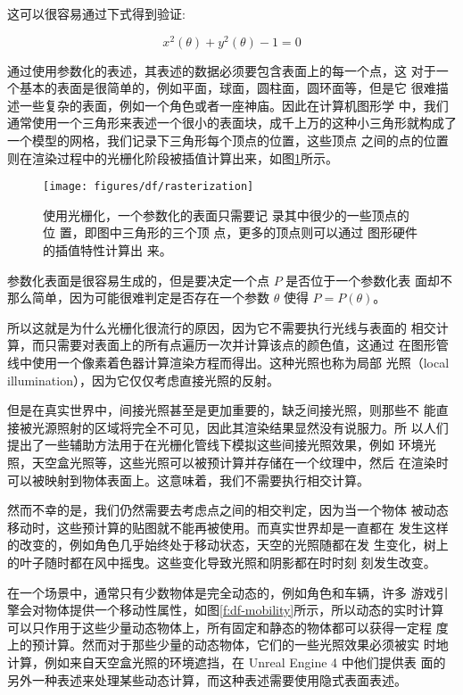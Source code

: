 \noindent 这可以很容易通过下式得到验证:

\begin{equation}
	x^{2}(\theta)+y^{2}(\theta)-1=0
\end{equation}

通过使用参数化的表述，其表述的数据必须要包含表面上的每一个点，这 对于一个基本的表面是很简单的，例如平面，球面，圆柱面，圆环面等，但是它 很难描述一些复杂的表面，例如一个角色或者一座神庙。因此在计算机图形学 中，我们通常使用一个三角形来表述一个很小的表面块，成千上万的这种小三角形就构成了一个模型的网格，我们记录下三角形每个顶点的位置，这些顶点 之间的点的位置则在渲染过程中的光栅化阶段被插值计算出来，如图\ref{f:df-rasterization}所示。

\begin{figure}
	\sidecaption
	\texttt{[image: figures/df/rasterization]}
	\caption{使用光栅化，一个参数化的表面只需要记 录其中很少的一些顶点的位 置，即图中三角形的三个顶 点，更多的顶点则可以通过 图形硬件的插值特性计算出 来。}
	\label{f:df-rasterization}
\end{figure}

参数化表面是很容易生成的，但是要决定一个点 $P$ 是否位于一个参数化表 面却不那么简单，因为可能很难判定是否存在一个参数 $\theta$ 使得 $P = P (\theta)$。

所以这就是为什么光栅化很流行的原因，因为它不需要执行光线与表面的 相交计算，而只需要对表面上的所有点遍历一次并计算该点的颜色值，这通过 在图形管线中使用一个像素着色器计算渲染方程而得出。这种光照也称为局部 光照（local illumination），因为它仅仅考虑直接光照的反射。

但是在真实世界中，间接光照甚至是更加重要的，缺乏间接光照，则那些不 能直接被光源照射的区域将完全不可见，因此其渲染结果显然没有说服力。所 以人们提出了一些辅助方法用于在光栅化管线下模拟这些间接光照效果，例如 环境光照，天空盒光照等，这些光照可以被预计算并存储在一个纹理中，然后 在渲染时可以被映射到物体表面上。这意味着，我们不需要执行相交计算。

然而不幸的是，我们仍然需要去考虑点之间的相交判定，因为当一个物体 被动态移动时，这些预计算的贴图就不能再被使用。而真实世界却是一直都在 发生这样的改变的，例如角色几乎始终处于移动状态，天空的光照随都在发 生变化，树上的叶子随时都在风中摇曳。这些变化导致光照和阴影都在时时刻 刻发生改变。

在一个场景中，通常只有少数物体是完全动态的，例如角色和车辆，许多 游戏引擎会对物体提供一个移动性属性，如图\ref{f:df-mobility}所示，所以动态的实时计算 可以只作用于这些少量动态物体上，所有固定和静态的物体都可以获得一定程 度上的预计算。然而对于那些少量的动态物体，它们的一些光照效果必须被实 时地计算，例如来自天空盒光照的环境遮挡，在 Unreal Engine 4 中他们提供表 面的另外一种表述来处理某些动态计算，而这种表述需要使用隐式表面表述。

